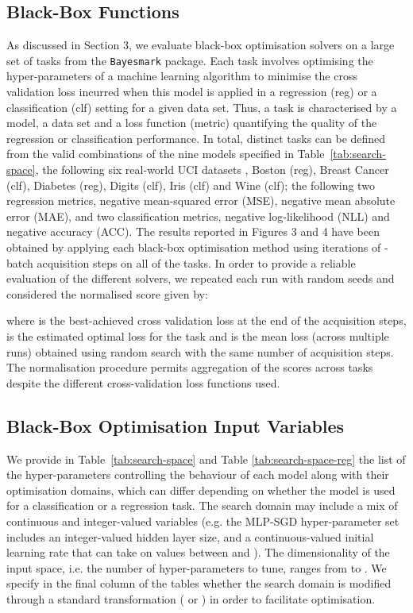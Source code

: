 \documentclass[jair,twoside,11pt,theapa]{article}
\let\cite\shortcite
\theoremstyle{definition}
\begin{document}
\subsection{Black-Box Functions} 
As discussed in Section 3, we evaluate black-box optimisation solvers on a large set of tasks from the \texttt{Bayesmark} package. Each task involves optimising the hyper-parameters of a machine learning algorithm to minimise the cross validation loss incurred when this model is applied in a regression (reg) or a classification (clf) setting for a given data set. 
 Thus, a task is characterised by a model, a data set and a loss function (metric) quantifying the quality of the regression or classification performance. In total,  distinct tasks can be defined from the valid combinations of the nine models specified in Table~\ref{tab:search-space}, the following six real-world UCI datasets \cite{2019_Dua}, Boston (reg), Breast Cancer (clf), Diabetes (reg), Digits (clf), Iris (clf) and Wine (clf); the following two regression metrics, negative mean-squared error (MSE), negative mean absolute error (MAE), and two classification metrics, negative log-likelihood (NLL) and negative accuracy (ACC).
 The results reported in Figures 3 and 4 have been obtained by applying each black-box optimisation method using  iterations of -batch acquisition steps on all of the  tasks. In order to provide a reliable evaluation of the different solvers, we repeated each run with  random seeds and considered the normalised score given by:
 
    
    
where  is the best-achieved cross validation loss at the end of the  acquisition steps,  is the estimated optimal loss for the task and  is the mean loss (across multiple runs) obtained using random search with the same number of acquisition steps. The normalisation procedure permits aggregation of the scores across tasks despite the different cross-validation loss functions used. 


    
\subsection{Black-Box Optimisation Input Variables} 

    We provide in Table~\ref{tab:search-space} and Table \ref{tab:search-space-reg} the list of the hyper-parameters controlling the behaviour of each model along with their optimisation domains, which can differ depending on whether the model is used for a classification or a regression task. The search domain may include a mix of continuous and integer-valued variables (e.g. the MLP-SGD hyper-parameter set includes an integer-valued hidden layer size, and a continuous-valued initial learning rate that can take on values between  and ). The dimensionality of the input space, i.e. the number of hyper-parameters to tune, ranges from  to . We specify in the final column of the tables whether the search domain is modified through a standard transformation (  or ) in order to facilitate optimisation. 
    
\end{document}
